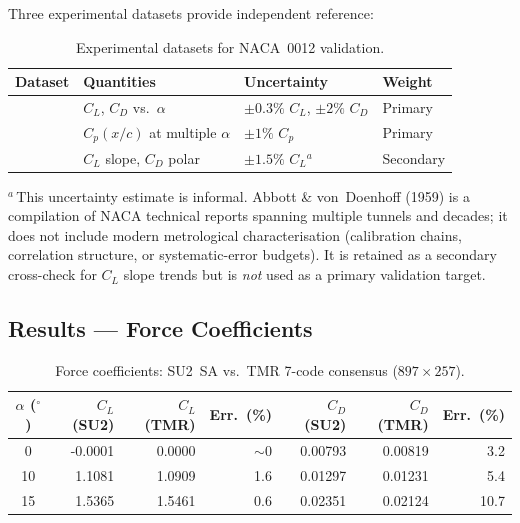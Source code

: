 \documentclass[11pt,a4paper]{article}
\begin{document}
Three experimental datasets provide independent reference:

\begin{table}[!ht]
\centering
\caption{Experimental datasets for NACA~0012 validation.}
\label{tab:exp_data}
\begin{tabular}{llll}
\toprule
\textbf{Dataset} & \textbf{Quantities} & \textbf{Uncertainty} & \textbf{Weight} \\
\midrule
\cite{Ladson1988}             & $C_L$, $C_D$ vs.\ $\alpha$  & $\pm0.3\%$ $C_L$, $\pm2\%$ $C_D$ & Primary \\
\cite{GregoryOReilly1970}     & $C_p(x/c)$ at multiple $\alpha$ & $\pm1\%$ $C_p$ & Primary \\
\cite{AbbottVonDoenhoff1959}  & $C_L$ slope, $C_D$ polar     & $\pm1.5\%$ $C_L$$^a$ & Secondary \\
\bottomrule
\end{tabular}

\medskip\footnotesize
$^a$\,This uncertainty estimate is informal.  Abbott \& von~Doenhoff (1959) is a
compilation of NACA technical reports spanning multiple tunnels and decades;
it does not include modern metrological characterisation (calibration chains,
correlation structure, or systematic-error budgets).  It is retained as a
secondary cross-check for $C_L$ slope trends but is \emph{not} used as a
primary validation target.
\end{table}


\subsection{Results --- Force Coefficients}

\begin{table}[!ht]
\centering
\caption{Force coefficients: SU2~SA vs.\ TMR 7-code consensus ($897\times257$).}
\label{tab:forces}
\begin{tabular}{c r r
                r r
                r r}
\toprule
{$\alpha$ ($^\circ$)} & {$C_L$ (SU2)} & {$C_L$ (TMR)} & {Err.\ (\%)} &
{$C_D$ (SU2)} & {$C_D$ (TMR)} & {Err.\ (\%)} \\
\midrule
0  & -0.0001 & 0.0000 & {${\sim}0$} & 0.00793 & 0.00819 & 3.2 \\
10 &  1.1081 & 1.0909 & 1.6          & 0.01297 & 0.01231 & 5.4 \\
15 &  1.5365 & 1.5461 & 0.6          & 0.02351 & 0.02124 & 10.7 \\
\bottomrule
\end{tabular}
\end{table}
\end{document}
